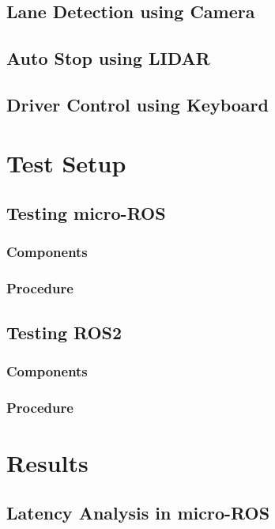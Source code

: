\documentclass[%
xelatex,
	oneside,		%
	12pt,			%
	parskip=half,	%
	abstracton,
	chapterprefix=true%
    appendixprefix=true]
{scrbook}
\begin{document}
		\section{Lane Detection using Camera}
		\section{Auto Stop using LIDAR}
		\section{Driver Control using Keyboard}	
	
	
	
	\chapter{Test Setup}
		
\rofoot[\pagemark]{\pagemark}

	\section{Testing micro-ROS}

	\subsection{Components}
	\subsection{Procedure}	

	\section{Testing ROS2}
	\subsection{Components}
	\subsection{Procedure}	


		\chapter{Results}
			
\rofoot[\pagemark]{\pagemark}
		\section{Latency Analysis in micro-ROS}
\end{document}
